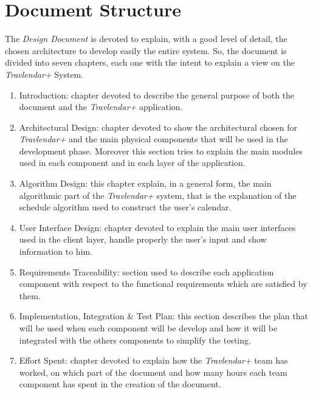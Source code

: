 \section{Document Structure}
The \emph{Design Document} is devoted to explain, with a good level of detail, the chosen architecture to develop easily the entire system. So, the document is divided into seven chapters, each one with the intent to explain a view on the \emph{Travlendar+} System.

\begin{enumerate}

    \item Introduction: chapter devoted to describe the general purpose of both the document and the \emph{Travlendar+} application.
    
    \item Architectural Design: chapter devoted to show the architectural chosen for \emph{Travlendar+} and the main physical components that will be used in the development phase. Moreover this section tries to explain the main modules used in each component and in each layer of the application.
    
    \item Algorithm Design: this chapter explain, in a general form, the main algorithmic part of the \emph{Travlendar+} system, that is the explanation of the schedule algorithm used to construct the user's calendar.
    
    \item User Interface Design: chapter devoted to explain the main user interfaces used in the client layer, handle properly the user's input and show information to him.
    
    \item Requirements Traceability: section used to describe each application component with respect to the functional requirements which are satisfied by them.
    
    \item Implementation, Integration \& Test Plan: this section describes the plan that will be used when each component will be develop and how it will be integrated with the others components to simplify the testing.
    
    \item Effort Spent: chapter devoted to explain how the \emph{Travlendar+} team has worked, on which part of the document and how many hours each team component has spent in the creation of the document.
\end{enumerate}